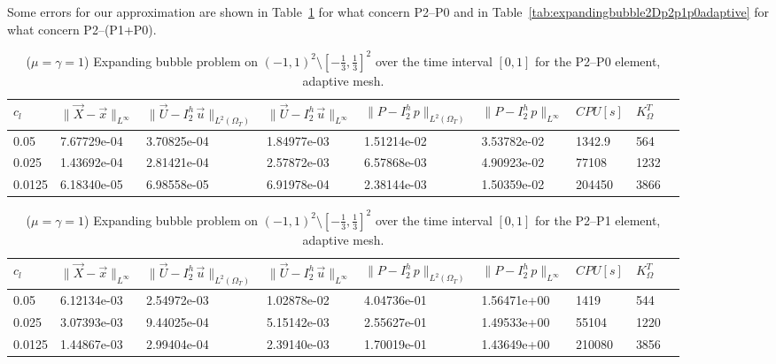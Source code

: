 \documentclass[a4paper,12pt,onecolumn]{article}
\newcommand{\errorXx}{\|\vec{X} - \vec{x}\|_{L^\infty}}
\newcommand{\LerrorUu}[1]{\|\vec U - I^h_{#1}\,\vec u\|_{L^2(\Omega_T)}}
\newcommand{\errorUu}[1]{\|\vec U - I^h_{#1}\,\vec u\|_{L^\infty}}
\newcommand{\errorPp}[1]{\|P - I^h_{#1}\,p\|_{L^\infty}}
\newcommand{\LerrorPp}[1]{\|P - I^h_{#1}\,p\|_{L^2(\Omega_T)}}
\begin{document}
Some errors for our approximation are shown in Table~\ref{tab:expandingbubble2Dp2p0adaptive} for what concern P2--P0 and in Table~\ref{tab:expandingbubble2Dp2p1p0adaptive} for what concern P2--(P1+P0).

\begin{table}
 \center
 \hspace*{-2cm}
\begin{tabular}{lllllllll}
\hline
$c_l$ & $\errorXx$ & $\LerrorUu2$ & $\errorUu2$ & $\LerrorPp2$ & $\errorPp2$ & $CPU[s]$ & $K_\Omega^T$\\
\hline
0.05 & 7.67729e-04 & 3.70825e-04 & 1.84977e-03 & 1.51214e-02 & 3.53782e-02 & 1342.9 & 564\\
0.025 & 1.43692e-04 & 2.81421e-04 & 2.57872e-03 & 6.57868e-03 & 4.90923e-02 & 77108 & 1232\\
0.0125 & 6.18340e-05 & 6.98558e-05 & 6.91978e-04 & 2.38144e-03 & 1.50359e-02 & 204450 & 3866\\
\hline
\end{tabular}
\hspace*{-2cm}
\caption{($\mu=\gamma=1$) Expanding bubble problem on $(-1,1)^2\setminus[-\frac{1}{3},\frac{1}{3}]^2$ over the time interval $[0,1]$ for the P2--P0 element, adaptive mesh.}
\label{tab:expandingbubble2Dp2p0adaptive}
\end{table}

\begin{table}
 \center
 \hspace*{-2cm}
\begin{tabular}{lllllllll}
\hline
$c_l$ & $\errorXx$ & $\LerrorUu2$ & $\errorUu2$ & $\LerrorPp2$ & $\errorPp2$ & $CPU[s]$ & $K_\Omega^T$\\
\hline
0.05 & 6.12134e-03 & 2.54972e-03 & 1.02878e-02 & 4.04736e-01 & 1.56471e+00 & 1419 & 544\\
0.025 & 3.07393e-03 & 9.44025e-04 & 5.15142e-03 & 2.55627e-01 & 1.49533e+00 & 55104 & 1220\\
0.0125 & 1.44867e-03 & 2.99404e-04 & 2.39140e-03 & 1.70019e-01 & 1.43649e+00 & 210080 & 3856\\
\hline
\end{tabular}
\hspace*{-2cm}
\caption{($\mu=\gamma=1$) Expanding bubble problem on $(-1,1)^2\setminus[-\frac{1}{3},\frac{1}{3}]^2$ over the time interval $[0,1]$ for the P2--P1 element, adaptive mesh.}
\label{tab:expandingbubble2Dp2p1adaptive}
\end{table}
\end{document}
